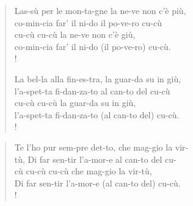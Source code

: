 \documentclass{article}
\begin{document}
\begin{score} 

\end{score}

\begin{figure}[h!]
\begin{minipage}{80mm}
\begin{verse} 
Las-s\`u per le mon-ta-gne la ne-ve non c'\`e pi\`u, \\
co-min-cia far' il ni-do il po-ve-ro cu-c\`u \\ 
cu-c\`u cu-c\`u la ne-ve non c'\`e gi\`u, \\
co-min-cia far' il ni-do (il po-ve-ro) cu-c\`u. \\!


La bel-la alla fin-es-tra, la guar-da su in gi\`u, \\
l'a-spet-ta fi-dan-za-to al can-to del cu-c\`u \\
 cu-c\`u cu-c\`u  la guar-da su in gi\`u, \\
l'a-spet-ta fi-dan-za-to (al can-to del) cu-c\`u.  \\!
\end{verse}
\end{minipage}
\begin{minipage}{80mm}
\begin{verse} 
Te l'ho pur sem-pre det-to, che mag-gio la vir- \\
t\`u, Di far sen-tir l'a-mor-e al can-to del cu- \\
c\`u cu-c\`u cu-c\`u  che mag-gio la vir-t\`u,  \\
Di far sen-tir l'a-mor-e (al can-to del) cu-c\`u. \\!
\end{verse}
\end{minipage}

\end{figure}
\end{document}
